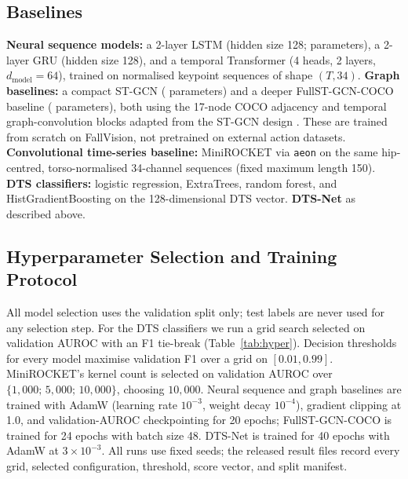 \documentclass[letterpaper]{article}
\begin{document}
\subsection{Baselines}
\textbf{Neural sequence models:} a 2-layer LSTM (hidden size 128; \lstmparams{} parameters), a 2-layer GRU (hidden size 128), and a temporal Transformer (4 heads, 2 layers, $d_{\mathrm{model}}=64$), trained on normalised keypoint sequences of shape $(T, 34)$. \textbf{Graph baselines:} a compact ST-GCN (\gcnparams{} parameters) and a deeper FullST-GCN-COCO baseline (\fullgcnparams{} parameters), both using the 17-node COCO adjacency and temporal graph-convolution blocks adapted from the ST-GCN design \citep{yan2018}. These are trained from scratch on FallVision, not pretrained on external action datasets. \textbf{Convolutional time-series baseline:} MiniROCKET \citep{dempster2021} via \texttt{aeon} \citep{middlehurst2024} on the same hip-centred, torso-normalised 34-channel sequences (fixed maximum length 150). \textbf{DTS classifiers:} logistic regression, ExtraTrees, random forest, and HistGradientBoosting on the 128-dimensional DTS vector. \textbf{DTS-Net} as described above.

\subsection{Hyperparameter Selection and Training Protocol}
All model selection uses the validation split only; test labels are never used for any selection step. For the DTS classifiers we run a grid search selected on validation AUROC with an F1 tie-break (Table~\ref{tab:hyper}). Decision thresholds for every model maximise validation F1 over a grid on $[0.01, 0.99]$. MiniROCKET's kernel count is selected on validation AUROC over $\{1{,}000;\,5{,}000;\,10{,}000\}$, choosing $10{,}000$. Neural sequence and graph baselines are trained with AdamW (learning rate $10^{-3}$, weight decay $10^{-4}$), gradient clipping at 1.0, and validation-AUROC checkpointing for 20 epochs; FullST-GCN-COCO is trained for 24 epochs with batch size 48. DTS-Net is trained for 40 epochs with AdamW at $3{\times}10^{-3}$. All runs use fixed seeds; the released result files record every grid, selected configuration, threshold, score vector, and split manifest.
\end{document}
